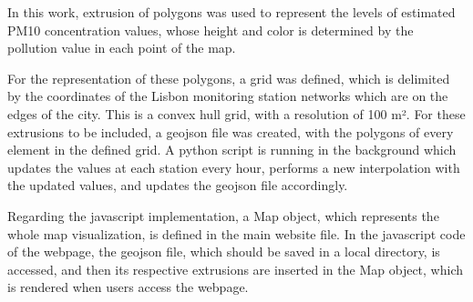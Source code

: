 In this work, extrusion of polygons was used to represent the levels of estimated PM10 concentration values, whose height and color is determined by the pollution value in each point of the map.

For the representation of these polygons, a grid was defined, which is delimited by the coordinates of the Lisbon monitoring station networks which are on the edges of the city. This is a convex hull grid, with a resolution of 100 m². For these extrusions to be included, a geojson file was created, with the polygons of every element in the defined grid. A python script is running in the background which updates the values at each station every hour, performs a new interpolation with the updated values, and updates the geojson file accordingly.

Regarding the javascript implementation, a Map object, which represents the whole map visualization, is defined in the main website file. In the javascript code of the webpage, the geojson file, which should be saved in a local directory, is accessed, and then its respective extrusions are inserted in the Map object, which is rendered when users access the webpage.



